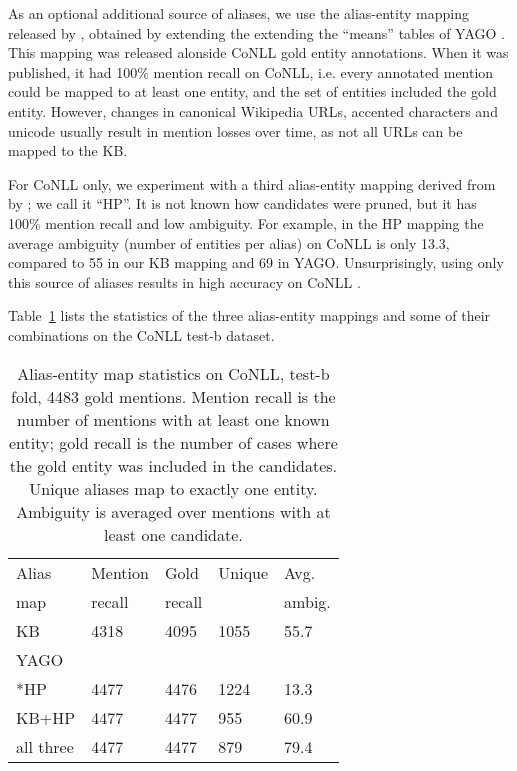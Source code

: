 As an optional additional source of aliases, we use the alias-entity mapping released
by , obtained by extending the extending the
``means'' tables of YAGO \cite{hoffart2013yago2}. This mapping was released alonside
CoNLL gold entity annotations. When it was
published, it had 100\% mention recall on CoNLL, i.e. every annotated mention
could be mapped to at least one entity, and the set of entities included the gold entity. 
However, changes in canonical Wikipedia URLs, accented characters and
unicode usually result in mention losses over time, as not all URLs can be mapped to the KB.

For CoNLL only, we experiment with a third alias-entity mapping derived 
from \cite{Hoffart2011} by ; we call it ``HP''.  
It is not known how candidates were pruned, but it has 100\% mention recall
and low ambiguity. For example, in the HP mapping the average ambiguity (number of
entities per alias) on CoNLL is only 13.3, compared to 55 in our KB mapping
and 69 in YAGO. Unsurprisingly, using only this source of aliases results in
high accuracy on CoNLL  \cite{Pershina2015,YamadaS0T16}.  

Table~\ref{tab:AliasTable} lists the statistics of the three alias-entity mappings
 and some of their combinations on the CoNLL test-b dataset.

\begin{table}
  \centering
  \begin{tabular}{l|l|l|l|l}
    Alias & Mention &   Gold & Unique & Avg.  \\
    map          & recall  & recall &        & ambig. \\
    \hline
    KB     & 4318 & 4095 & 1055   & 55.7  \\
    YAGO & & & & \\
    *HP & 4477 & 4476   & 1224   & 13.3   \\
    KB+HP  & 4477 &  4477 & 955    & 60.9   \\
    all three& 4477    & 4477   & 879    & 79.4       
  \end{tabular}
  \caption{Alias-entity map statistics on CoNLL, test-b
    fold, 4483 gold mentions.  Mention recall is the number of
    mentions with at least one known entity; gold recall is the number
    of cases where the gold entity was included in the candidates.
    Unique aliases map to exactly one entity.  Ambiguity is averaged over
    mentions with at least one candidate.}
  \label{tab:AliasTable}
\end{table}


